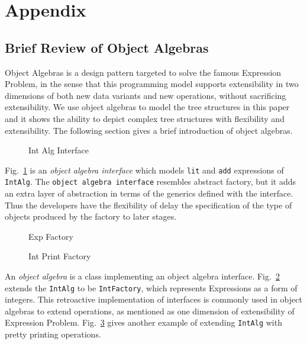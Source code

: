 \section{Appendix}\label{sec:appendix}

\clearpage
\subsection{Brief Review of Object Algebras}\label{subsec:ObjectAlgebras}

Object Algebras is a design pattern targeted to solve the famous Expression Problem, in the sense that this programming model supports extensibility in two dimensions of both new data variants and new operations, without sacrificing extensibility. We use object algebras to model the tree structures in this paper and it shows the ability to depict complex tree structures with flexibility and extensibility. The following section gives a brief introduction of object algebras. 

\begin{figure}[t]
\nocaptionrule
\caption{Int Alg Interface}
\label{int_alg_interface}
\end{figure}

Fig.~\ref{int_alg_interface} is an \emph{object algebra interface} which models \lstinline{lit} and \lstinline{add} expressions of \lstinline{IntAlg}. The \lstinline{object algebra interface} resembles abstract factory, but it adds an extra layer of abstraction in terms of the generics defined with the interface. Thus the developers have the flexibility of delay the specification of the type of objects produced by the factory to later stages. 

\begin{figure}[t]
\nocaptionrule
\caption{Exp Factory}
\label{exp_factory}
\end{figure}

\begin{figure}[t]
\nocaptionrule
\caption{Int Print Factory}
\label{int_print_factory}
\end{figure}

An \emph{object algebra} is a class implementing an object algebra interface. Fig.~\ref{exp_factory} extends the \lstinline{IntAlg} to be \lstinline{IntFactory}, which represents Expressions as a form of integers. This retroactive implementation of interfaces is commonly used in object algebras to extend operations, as mentioned as one dimension of extensibility of Expression Problem. Fig.~\ref{int_print_factory} gives another example of extending \lstinline{IntAlg} with pretty printing operations.  

